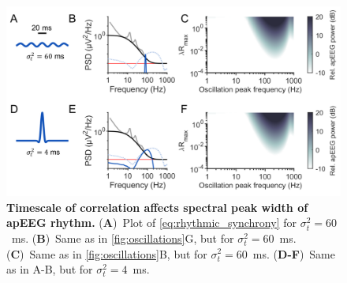 \begin{figure}[h!]
    \centering
    \includegraphics[width=13.2cm]{Figures/chapter3/figureS6.png}
    \caption{\textbf{Timescale of correlation affects spectral peak width of apEEG rhythm.} (\textbf{A})~Plot of {\ref{eq:rhythmic_synchrony}} for $\sigma_t^2=60$~\unit{\milli\second}. (\textbf{B})~Same as in {\autoref{fig:oscillations}G}, but for $\sigma_t^2=60$~\unit{\milli\second}. (\textbf{C})~Same as in {\autoref{fig:oscillations}B}, but for $\sigma_t^2=60$~\unit{\milli\second}. (\textbf{D-F})~Same as in A-B, but for  $\sigma_t^2=4$~\unit{\milli\second}.}
    \label{fig:ap_rhythm_more_sig}
\end{figure}

\clearpage

